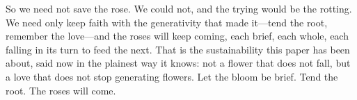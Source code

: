 So we need not save the rose. We could not, and the trying would be the rotting. We need only keep faith with the generativity that made it---tend the root, remember the love---and the roses will keep coming, each brief, each whole, each falling in its turn to feed the next. That is the sustainability this paper has been about, said now in the plainest way it knows: not a flower that does not fall, but a love that does not stop generating flowers. Let the bloom be brief. Tend the root. The roses will come.
